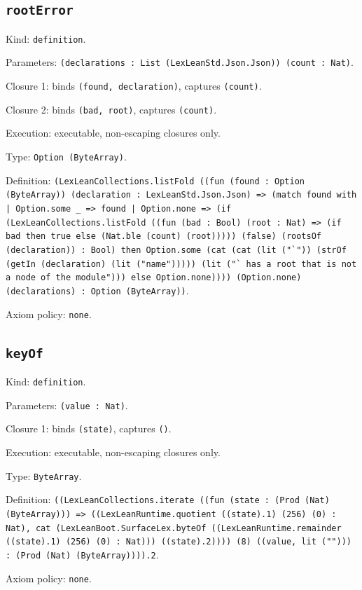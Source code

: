 \documentclass[11pt]{article}
\begin{document}
\subsection*{\texttt{rootError}}
\noindent Kind: \texttt{definition}.\par
\noindent Parameters: \texttt{(declarations : List (LexLeanStd.Json.Json)) (count : Nat)}.\par
\noindent Closure 1: binds \texttt{(found, declaration)}, captures \texttt{(count)}.\par
\noindent Closure 2: binds \texttt{(bad, root)}, captures \texttt{(count)}.\par
\noindent Execution: executable, non-escaping closures only.\par
\noindent Type: \texttt{Option (ByteArray)}.\par
\noindent Definition: \texttt{(LexLeanCollections.listFold ((fun (found : Option (ByteArray)) (declaration : LexLeanStd.Json.Json) => (match found with | Option.some \_ => found | Option.none => (if (LexLeanCollections.listFold ((fun (bad : Bool) (root : Nat) => (if bad then true else (Nat.ble (count) (root))))) (false) (rootsOf (declaration)) : Bool) then Option.some (cat (cat (lit ("`")) (strOf (getIn (declaration) (lit ("name"))))) (lit ("` has a root that is not a node of the module"))) else Option.none)))) (Option.none) (declarations) : Option (ByteArray))}.\par
\noindent Axiom policy: \texttt{none}.\par
\subsection*{\texttt{keyOf}}
\noindent Kind: \texttt{definition}.\par
\noindent Parameters: \texttt{(value : Nat)}.\par
\noindent Closure 1: binds \texttt{(state)}, captures \texttt{()}.\par
\noindent Execution: executable, non-escaping closures only.\par
\noindent Type: \texttt{ByteArray}.\par
\noindent Definition: \texttt{((LexLeanCollections.iterate ((fun (state : (Prod (Nat) (ByteArray))) => ((LexLeanRuntime.quotient ((state).1) (256) (0) : Nat), cat (LexLeanBoot.SurfaceLex.byteOf ((LexLeanRuntime.remainder ((state).1) (256) (0) : Nat))) ((state).2)))) (8) ((value, lit (""))) : (Prod (Nat) (ByteArray)))).2}.\par
\noindent Axiom policy: \texttt{none}.\par
\end{document}
